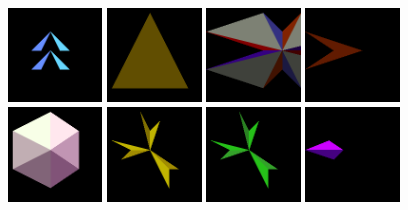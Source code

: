 \begin{figure}[H]
\includegraphics[width=2.5cm]{preface/obj2d/obj_18.png}
\includegraphics[width=2.5cm]{preface/obj2d/obj_19.png}
\includegraphics[width=2.5cm]{preface/obj2d/obj_2.png}
\includegraphics[width=2.5cm]{preface/obj2d/obj_20.png}
\includegraphics[width=2.5cm]{preface/obj2d/obj_21.png}
\includegraphics[width=2.5cm]{preface/obj2d/obj_22.png}
\includegraphics[width=2.5cm]{preface/obj2d/obj_23.png}
\includegraphics[width=2.5cm]{preface/obj2d/obj_24.png}

\end{figure}
